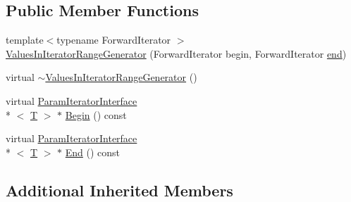 \subsection*{Public Member Functions}
\begin{DoxyCompactItemize}
\item 
{\footnotesize template$<$typename Forward\-Iterator $>$ }\\\hyperlink{classtesting_1_1internal_1_1ValuesInIteratorRangeGenerator_a8b30f6028bc5739bbd7c24b0f0e409f7}{Values\-In\-Iterator\-Range\-Generator} (Forward\-Iterator begin, Forward\-Iterator \hyperlink{legacy_8hpp_ab21668ff869102944cbf3bb534bba27d}{end})
\item 
virtual \hyperlink{classtesting_1_1internal_1_1ValuesInIteratorRangeGenerator_ab921d9574baa83a8d081f05aa2ebeaa4}{$\sim$\-Values\-In\-Iterator\-Range\-Generator} ()
\item 
virtual \hyperlink{classtesting_1_1internal_1_1ParamIteratorInterface}{Param\-Iterator\-Interface}\\*
$<$ \hyperlink{calib3d_8hpp_a3efb9551a871ddd0463079a808916717}{T} $>$ $\ast$ \hyperlink{classtesting_1_1internal_1_1ValuesInIteratorRangeGenerator_a6e9c4b490d57e0ad0396b70d9a7854fd}{Begin} () const 
\item 
virtual \hyperlink{classtesting_1_1internal_1_1ParamIteratorInterface}{Param\-Iterator\-Interface}\\*
$<$ \hyperlink{calib3d_8hpp_a3efb9551a871ddd0463079a808916717}{T} $>$ $\ast$ \hyperlink{classtesting_1_1internal_1_1ValuesInIteratorRangeGenerator_aa838affa584afa9f91c44f9d1c0509c4}{End} () const 
\end{DoxyCompactItemize}
\subsection*{Additional Inherited Members}


